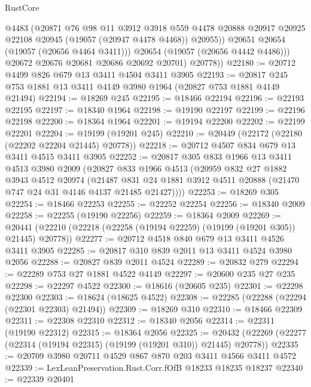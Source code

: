 \begin{lexlean}{RustCore}
\begin{coremodule}
                @4483
                (@20871
                  @76
                  @98
                  @11
                  @3912
                  @3918
                  @559
                  @4478
                  @20888
                  @20917
                  @20925
                  @22108
                  @20945
                  (@19057 (@20947 @4478 @4468))
                  @20955))
              @20651
              @20654
              (@19057 (@20656 @4464 @3411)))
            @20654
            (@19057 (@20656 @4442 @4486)))
          @20672
          @20676
          @20681
          @20686
          @20692
          @20701)
        @20778))
@22180 := @20712 @4499 @826 @679 @13 @3411 @4504 @3411 @3905
@22193 := @20817 @245 @753 @1881 @13 @3411 @4149 @3980 @1964 (@20827 @753 @1881 @4149 @21494)
@22194 := @18269 @245
@22195 := @18466 @22194
@22196 := @22193 @22195
@22197 := @18340 @1964
@22198 := @19190 @22197
@22199 := @22196 @22198
@22200 := @18364 @1964
@22201 := @19194 @22200
@22202 := @22199 @22201
@22204 := @19199 (@19201 @245)
@22210 := @20449 (@22172 (@22180 (@22202 @22204 @21445) @20778))
@22218 := @20712 @4507 @834 @679 @13 @3411 @4515 @3411 @3905
@22252 := @20817
    @305
    @833
    @1966
    @13
    @3411
    @4513
    @3980
    @2009
    (@20827
      @833
      @1966
      @4513
      (@20959
        @832
        @27
        @1882
        @3943
        @4512
        @20974
        (@21487 @831 @24 @1881 @3912 @4511 @20888 (@21470 @747 @24 @31 @4146 @4137 @21485 @21427))))
@22253 := @18269 @305
@22254 := @18466 @22253
@22255 := @22252 @22254
@22256 := @18340 @2009
@22258 := @22255 (@19190 @22256)
@22259 := @18364 @2009
@22269 := @20441 (@22210 (@22218 (@22258 (@19194 @22259) (@19199 (@19201 @305)) @21445) @20778))
@22277 := @20712 @4518 @840 @679 @13 @3411 @4526 @3411 @3905
@22285 := @20817 @310 @839 @2011 @13 @3411 @4524 @3980 @2056
@22288 := @20827 @839 @2011 @4524
@22289 := @20832 @279
@22294 := @22289 @753 @27 @1881 @4522 @4149
@22297 := @20600 @235 @27 @235
@22298 := @22297 @4522
@22300 := @18616 (@20605 @235)
@22301 := @22298 @22300
@22303 := @18624 (@18625 @4522)
@22308 := @22285 (@22288 (@22294 (@22301 @22303) @21494))
@22309 := @18269 @310
@22310 := @18466 @22309
@22311 := @22308 @22310
@22312 := @18340 @2056
@22314 := @22311 (@19190 @22312)
@22315 := @18364 @2056
@22325 := @20432 (@22269 (@22277 (@22314 (@19194 @22315) (@19199 (@19201 @310)) @21445) @20778))
@22335 := @20709 @3980 @20711 @4529 @867 @870 @203 @3411 @4566 @3411 @4572
@22339 := LexLeanPreservation.Rust.Corr.fOfB @18233 @18235 @18237
@22340 := @22339 @20401

\end{coremodule}
\end{lexlean}
